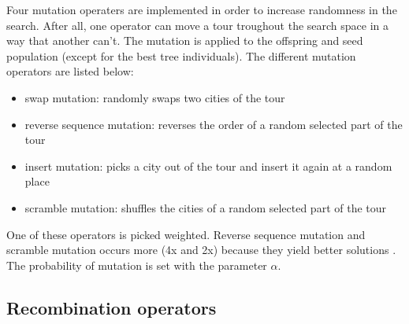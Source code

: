 \documentclass[a4paper,10pt]{article}
\newcommand{\ReplaceMe}[1]{{\color{blue}#1}}
\begin{document}
Four mutation operaters are implemented in order to increase randomness in the search. After all, one operator can move a tour troughout the search space in a way that another can't. The mutation is applied to the offspring and seed population (except for the best tree individuals). The different mutation operators are listed below:
\begin{itemize}
  \item swap mutation: randomly swaps two cities of the tour
  \item reverse sequence mutation: reverses the order of a random selected part of the tour
  \item insert mutation: picks a city out of the tour and insert it again at a random place
  \item scramble mutation: shuffles the cities of a random selected part of the tour
\end{itemize}
One of these operators is picked weighted. Reverse sequence mutation and scramble mutation occurs more (4x and 2x) because they yield better solutions \cite{mutationperformance}.
The probability of mutation is set with the parameter $\alpha$. %

\subsection{Recombination operators}\label{ssec:recombination}

\end{document}
